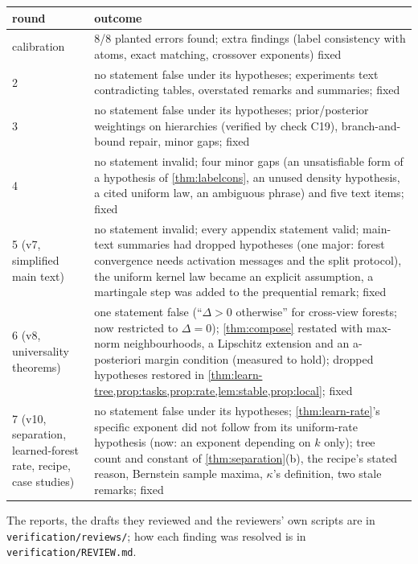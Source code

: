 \documentclass[11pt]{article}
\theoremstyle{definition}
\theoremstyle{remark}
\begin{document}
\begin{center}\small
\begin{tabular}{@{}lp{11.5cm}@{}}\toprule
round & outcome\\\midrule
calibration & 8/8 planted errors found; extra findings (label consistency with atoms, exact matching, crossover exponents) fixed\\
2 & no statement false under its hypotheses; experiments text contradicting tables, overstated remarks and summaries; fixed\\
3 & no statement false under its hypotheses; prior/posterior weightings on hierarchies (verified by check C19), branch-and-bound repair, minor gaps; fixed\\
4 & no statement invalid; four minor gaps (an unsatisfiable form of a hypothesis of \cref{thm:labelcons}, an unused density hypothesis, a cited uniform law, an ambiguous phrase) and five text items; fixed\\
5 (v7, simplified main text) & no statement invalid; every appendix statement valid; main-text summaries had dropped hypotheses (one major: forest convergence needs activation messages and the split protocol), the uniform kernel law became an explicit assumption, a martingale step was added to the prequential remark; fixed\\
6 (v8, universality theorems) & one statement false (``$\Delta>0$ otherwise'' for cross-view forests; now restricted to $\Delta=0$); \cref{thm:compose} restated with max-norm neighbourhoods, a Lipschitz extension and an a-posteriori margin condition (measured to hold); dropped hypotheses restored in \cref{thm:learn-tree,prop:tasks,prop:rate,lem:stable,prop:local}; fixed\\
7 (v10, separation, learned-forest rate, recipe, case studies) & no statement false under its hypotheses; \cref{thm:learn-rate}'s specific exponent did not follow from its uniform-rate hypothesis (now: an exponent depending on $k$ only); tree count and constant of \cref{thm:separation}(b), the recipe's stated reason, Bernstein sample maxima, $\kappa$'s definition, two stale remarks; fixed\\
\bottomrule
\end{tabular}
\end{center}

\noindent The reports, the drafts they reviewed and the reviewers' own scripts are in
\texttt{verification/reviews/}; how each finding was resolved is in
\texttt{verification/REVIEW.md}.



\end{document}
